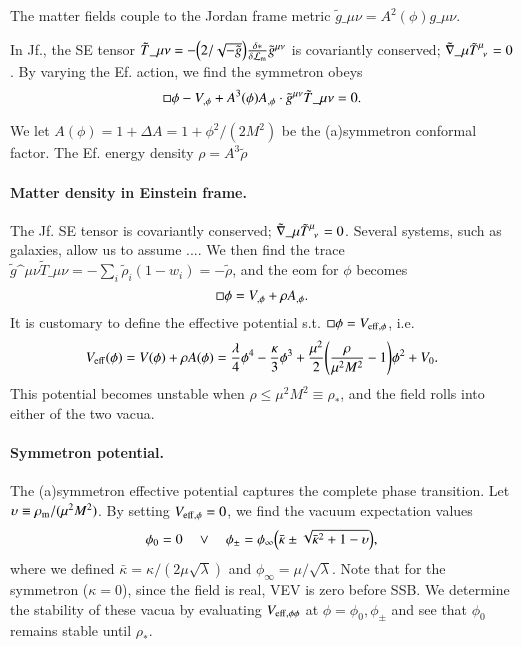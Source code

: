 The matter fields couple to the Jordan frame metric $\tilde{g}\_{\mu\nu} = A^2(\phi)g\_{\mu\nu}$. 

In Jf., the SE tensor $\tilde{T}\_{\mu\nu} = -\pclosed{2/\sqrt{-\tilde{g}}} \Fdv*{\mathcal{L}\ped{m}}{\tilde{g}\^{\mu\nu}}$ is covariantly conserved; $\tilde{\nabla}\_{\mu}\tilde{T}\indices{^{\mu}_{\nu}}=0$. By varying the Ef. action, we find the symmetron obeys
\begin{equation}
    \sq \phi -V_{,\phi} + A^3(\phi) A_{,\phi} \cdot\tilde{g}\^{\mu\nu} \tilde{T}\_{\mu\nu}=0 .
\end{equation}



We let $A(\phi)=1+\Delta A= 1 + \phi^2/(2M^2)$ be the (a)symmetron conformal factor. The Ef. energy density $\rho=A^3\tilde{\rho}$

\paragraph{Matter density in Einstein frame.} %
The Jf. SE tensor is covariantly conserved; $\tilde{\nabla}\_{\mu}\tilde{T}\indices{^{\mu}_{\nu}}=0$. Several systems, such as galaxies, allow us to assume  ....
We then find the trace $\tilde{g}\^{\mu\nu} \tilde{T}\_{\mu\nu}= -\sum_i \tilde{\rho}_i(1-w_i) =-\tilde{\rho}$, and the eom for $\phi$ becomes
\begin{equation}
    \sq \phi = V_{,\phi} + \rho A_{,\phi}.
\end{equation}
It is customary to define the effective potential s.t. $\sq \phi = V\ped{eff,\phi}$, i.e.
\begin{equation}
    V_\mathrm{eff}(\phi) = V(\phi) + \rho A(\phi) =  \frac{\lambda}{4} \phi^4 - \frac{\kappa}{3}\phi^3 + \frac{\mu^2}{2}{\left( \frac{\rho}{\mu^2M^2}-1 \right)} \phi^2 + V_0.
\end{equation}
\blahblah
This potential becomes unstable when $\rho\leq \mu^2M^2\equiv \rho_\ast$, and the field rolls into either of the two vacua. 


\paragraph{Symmetron potential.} %
    The (a)symmetron effective potential captures the complete phase transition. Let $\upsilon\equiv\rho_\mathrm{m}/(\mu^2M^2)$. By setting $V_\mathrm{eff,\phi}=0$, we find the vacuum expectation values
    \begin{equation}
        \phi_0 = 0 \quad \lor \quad \phi_\pm = \phi_\infty \pclosed{\bar{\kappa} \pm  \sqrt{\bar{\kappa}^2 +  1- \upsilon }},%
    \end{equation}
    where we defined $\bar{\kappa} = \kappa / (2\mu \sqrt{\lambda}) $ and $\phi_\infty = \mu/\sqrt{\lambda}$. Note that for the symmetron ($\kappa=0$), since the field is real, VEV is zero before SSB. We determine the stability of these vacua by evaluating $V_\mathrm{eff,\phi\phi}$ at $\phi=\phi_0,\phi_\pm$ and see that $\phi_0$ remains stable until $\rho_\ast$. 


